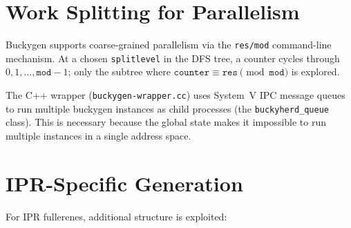 \documentclass[11pt,a4paper]{article}
\theoremstyle{definition}
\begin{document}
\section{Work Splitting for Parallelism}
\label{sec:splitting}

Buckygen supports coarse-grained parallelism via the \texttt{res/mod}
command-line mechanism.  At a chosen \texttt{splitlevel} in the DFS
tree, a counter cycles through $0, 1, \ldots, \texttt{mod}-1$; only
the subtree where $\texttt{counter} \equiv \texttt{res} \pmod{\texttt{mod}}$
is explored.

The C++ wrapper (\texttt{buckygen-wrapper.cc}) uses System~V IPC
message queues to run multiple buckygen instances as child processes
(the \texttt{buckyherd\_queue} class).  This is necessary because the
global state makes it impossible to run multiple instances in a single
address space.

\section{IPR-Specific Generation}
\label{sec:ipr}

For IPR fullerenes, additional structure is exploited:
\end{document}
